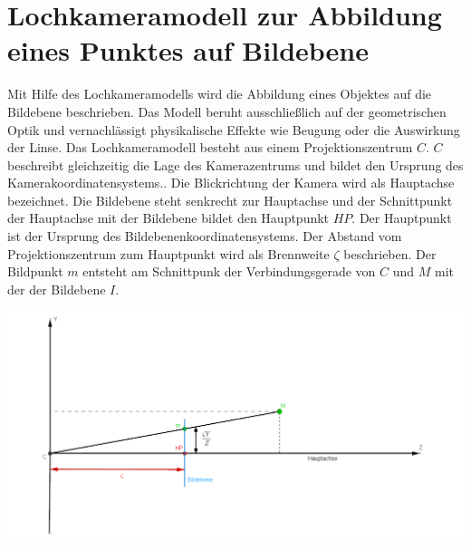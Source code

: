 \section{Lochkameramodell zur Abbildung eines Punktes auf Bildebene}

Mit Hilfe des Lochkameramodells wird die Abbildung eines Objektes auf die Bildebene beschrieben.
Das Modell beruht ausschließlich auf der geometrischen Optik und vernachlässigt physikalische Effekte wie Beugung oder die Auswirkung der Linse\cite{Heipke}. Das Lochkameramodell besteht aus einem Projektionszentrum $C$. $C$ beschreibt gleichzeitig die Lage des Kamerazentrums und bildet den Ursprung des Kamerakoordinatensystems.\cite{CamerModels.,HZ}.
Die Blickrichtung der Kamera wird als Hauptachse bezeichnet. Die Bildebene steht senkrecht zur Hauptachse und der Schnittpunkt der Hauptachse mit der Bildebene bildet den Hauptpunkt $HP$. Der Hauptpunkt ist der Ursprung des Bildebenenkoordinatensystems. Der Abstand vom Projektionszentrum zum Hauptpunkt wird als Brennweite $\zeta$ beschrieben\cite{HZ,CamerModels.}. Der Bildpunkt $m$ entsteht am Schnittpunk der Verbindungsgerade von $C$ und $M$ mit der der Bildebene $I$. 

\begin{minipage}{\linewidth}
	\centering
	\includegraphics[width=.8\linewidth]{images/PinholeCameraModell2D.png}
	\label{fig:PinholeCamera2D}
\end{minipage}\\ \\

